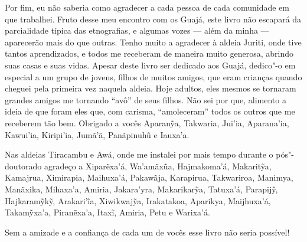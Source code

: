 Por fim, eu não saberia como agradecer a cada pessoa de cada comunidade
em que trabalhei. Fruto desse meu encontro com os Guajá, este livro não
escapará da parcialidade típica das etnografias, e algumas vozes --- além
da minha --- aparecerão mais do que outras. Tenho muito a agradecer à
aldeia Juriti, onde tive tantos aprendizados, e todos me receberam de
maneira muito generosa, abrindo suas casas e suas vidas. Apesar deste
livro ser dedicado aos Guajá, dedico"-o em especial a um grupo de jovens,
filhos de muitos amigos, que eram crianças quando cheguei pela primeira
vez naquela aldeia. Hoje adultos, eles mesmos se tornaram grandes amigos
me tornando ``avô'' de seus filhos. Não sei por que, alimento a ideia de
que foram eles que, com carisma, ``amoleceram'' todos os outros que me
receberem tão bem. Obrigado a vocês Aparanỹa, Takwaria, Jui'ia,
Aparana'ia, Kawui'ia, Kiripi'ia, Jumã'ã, Panãpinuhũ e Iauxa'a.

Nas aldeias Tiracambu e Awá, onde me instalei por mais tempo durante o
pós"-doutorado agradeço a Xiparẽxa'á, Wa'amãxũa, Hajmakoma'á, Makaritỹa,
Kamajrua, Ximirapia, Maihuxa'á, Pakawãja, Karapirua, Takwariroa,
Manimya, Manãxika, Mihaxa'a, Amiria, Jakara'yra, Makarikarỹa, Tatuxa'á, Parapijỹ,
Hajkaramỹkỹ, Arakari'ĩa, Xiwikwajỹa, Irakatakoa, Aparikya, Maijhuxa'á,
Takamỹxa'a, Piranẽxa'a, Itaxĩ, Amiria, Petu e Warixa'á.

Sem a amizade e a confiança de cada um de vocês esse livro não seria
possível!
